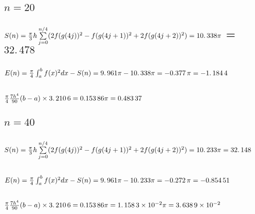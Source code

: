 \documentclass{article}
\begin{document}
\subsection{$n=20$}

\subsection{$S(n)=\frac{\protect\pi }{3}h\sum%
\limits_{j=0}^{n/4}(2f(g(4j))^{2}-f(g(4j+1))^{2}+2f(g(4j+2))^{2})=%
\allowbreak 10.\,\allowbreak 338\protect\pi $ = $32.\,\allowbreak 478$}

\subsection{$E(n)=\frac{\protect\pi }{4}\protect\int%
_{a}^{b}f(x)^{2}dx-S(n)=9.\,\allowbreak 961\protect\pi -10.\,\allowbreak 338%
\protect\pi =\allowbreak -0.377\,\protect\pi =-1.\,\allowbreak 184\,4$}

\subsection{$\frac{\protect\pi }{4}\frac{7h^{4}}{90}(b-a)\times
3.\,\allowbreak 210\,6=\allowbreak 0.153\,86\protect\pi =\allowbreak
0.483\,37$}

\bigskip

\subsection{$n=40$}

\subsection{$S(n)=\frac{\protect\pi }{3}h\sum%
\limits_{j=0}^{n/4}(2f(g(4j))^{2}-f(g(4j+1))^{2}+2f(g(4j+2))^{2})=%
\allowbreak 10.\,\allowbreak 233\protect\pi =\allowbreak 32.\,\allowbreak
148 $}

\subsection{$E(n)=\frac{\protect\pi }{4}\protect\int_{a}^{b}f(x)^{2}dx-S(n)=%
\allowbreak 9.\,\allowbreak 961\protect\pi -10.\,\allowbreak 233\protect\pi %
=\allowbreak -0.272\,\protect\pi =\allowbreak -0.854\,51$}

\subsection{\protect\bigskip $\frac{\protect\pi }{4}\frac{7h^{4}}{90}%
(b-a)\times 3.\,\allowbreak 210\,6=\allowbreak 0.153\,86\protect\pi %
=\allowbreak 1.\,\allowbreak 158\,3\times 10^{-2}\protect\pi =\allowbreak
3.\,\allowbreak 638\,9\times 10^{-2}$}
\end{document}
